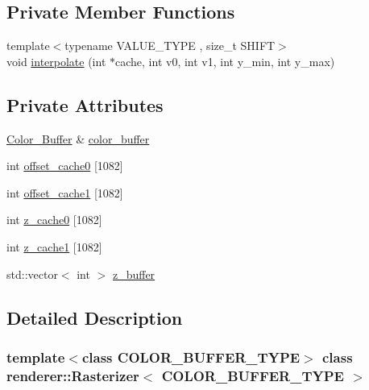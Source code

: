 \subsection*{Private Member Functions}
\begin{DoxyCompactItemize}
\item 
{\footnotesize template$<$typename V\+A\+L\+U\+E\+\_\+\+T\+Y\+PE , size\+\_\+t S\+H\+I\+FT$>$ }\\void \mbox{\hyperlink{classrenderer_1_1_rasterizer_a913bf8c97f3aefada8ca6937fba1c746}{interpolate}} (int $\ast$cache, int v0, int v1, int y\+\_\+min, int y\+\_\+max)
\end{DoxyCompactItemize}
\subsection*{Private Attributes}
\begin{DoxyCompactItemize}
\item 
\mbox{\hyperlink{classrenderer_1_1_rasterizer_a1568956faf65b03116e04b4cb0213770}{Color\+\_\+\+Buffer}} \& \mbox{\hyperlink{classrenderer_1_1_rasterizer_a8f65490d0dab32792922d9566db93a9f}{color\+\_\+buffer}}
\item 
int \mbox{\hyperlink{classrenderer_1_1_rasterizer_ad3d299399e521fec221ffdf0c84b1466}{offset\+\_\+cache0}} \mbox{[}1082\mbox{]}
\item 
int \mbox{\hyperlink{classrenderer_1_1_rasterizer_ae443d20aa2736ecb4068e4a6dc2031e2}{offset\+\_\+cache1}} \mbox{[}1082\mbox{]}
\item 
int \mbox{\hyperlink{classrenderer_1_1_rasterizer_a5586110fc96d19c0b3044c3647ad8ab3}{z\+\_\+cache0}} \mbox{[}1082\mbox{]}
\item 
int \mbox{\hyperlink{classrenderer_1_1_rasterizer_a6c6b512ee02cc0269ef2e520a562c265}{z\+\_\+cache1}} \mbox{[}1082\mbox{]}
\item 
std\+::vector$<$ int $>$ \mbox{\hyperlink{classrenderer_1_1_rasterizer_aef76a9315777cfced9114dcff76bc85e}{z\+\_\+buffer}}
\end{DoxyCompactItemize}


\subsection{Detailed Description}
\subsubsection*{template$<$class C\+O\+L\+O\+R\+\_\+\+B\+U\+F\+F\+E\+R\+\_\+\+T\+Y\+PE$>$\newline
class renderer\+::\+Rasterizer$<$ C\+O\+L\+O\+R\+\_\+\+B\+U\+F\+F\+E\+R\+\_\+\+T\+Y\+P\+E $>$}




